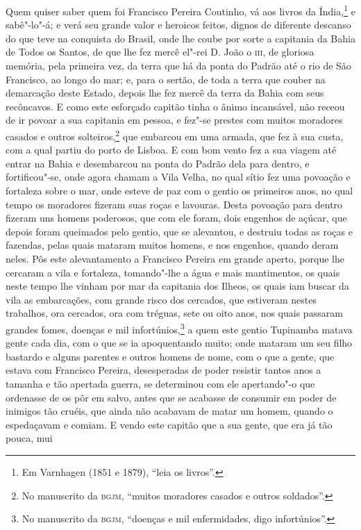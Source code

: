 Quem quiser saber quem foi Francisco Pereira Coutinho, vá aos livros da Índia,\footnote{
Em Varnhagen (1851 e 1879), ``leia os livros''.} e sabê"-lo"-á; e verá seu grande valor e
heroicos feitos, dignos de diferente descanso do que teve na conquista do Brasil, onde lhe
coube por sorte a capitania da Bahia de Todos os Santos, de que lhe fez mercê el"-rei D.
João o \textsc{iii}, de gloriosa memória, pela primeira vez, da terra que há da ponta do
Padrão até o rio de São Francisco, ao longo do mar; e, para o sertão, de toda a terra que
couber na demarcação deste Estado, depois lhe fez mercê da terra da Bahia com seus
recôncavos. E como este esforçado capitão tinha o ânimo incansável, não receou de ir
povoar a sua capitania em pessoa, e fez"-se prestes com muitos moradores casados e outros
solteiros,\footnote{ No manuscrito da \textsc{bgjm}, ``muitos moradores casados e outros
soldados''.} que embarcou em uma armada, que fez à sua custa, com a qual partiu do porto
de Lisboa. E com bom vento fez a sua viagem até entrar na Bahia e desembarcou na ponta do
Padrão dela para dentro, e fortificou"-se, onde agora chamam a Vila Velha, no qual sítio
fez uma povoação e fortaleza sobre o mar, onde esteve de paz com o gentio os primeiros
anos, no qual tempo os moradores fizeram suas roças e lavouras. Desta povoação para dentro
fizeram uns homens poderosos, que com ele foram, dois engenhos de açúcar, que depois foram
queimados pelo gentio, que se alevantou, e destruiu todas as roças e fazendas, pelas quais
mataram muitos homens, e nos engenhos, quando deram neles. Pôs este alevantamento a
Francisco Pereira em grande aperto, porque lhe cercaram a vila e fortaleza, tomando"-lhe a
água e mais mantimentos, os quais neste tempo lhe vinham por mar da capitania dos Ilheos,
os quais iam buscar da vila as embarcações, com grande risco dos cercados, que estiveram
nestes trabalhos, ora cercados, ora com tréguas, sete ou oito anos, nos quais passaram
grandes fomes, doenças e mil infortúnios,\footnote{ No manuscrito da \textsc{bgjm},
``doenças e mil enfermidades, digo infortúnios''.} a quem este gentio Tupinamba matava
gente cada dia, com o que se ia apoquentando muito; onde mataram um seu filho bastardo e
alguns parentes e outros homens de nome, com o que a gente, que estava com Francisco
Pereira, desesperadas de poder resistir tantos anos a tamanha e tão apertada guerra, se
determinou com ele apertando"-o que ordenasse de os pôr em salvo, antes que se acabasse de
consumir em poder de inimigos tão cruéis, que ainda não acabavam de matar um homem, quando
o espedaçavam e comiam. E vendo este capitão que a sua gente, que era já tão pouca, mui
